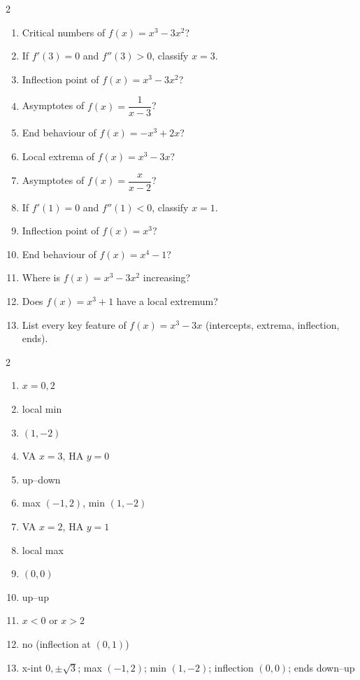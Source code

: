 \documentclass[11pt]{article}
\begin{document}
\begin{recapbox}
\begin{multicols}{2}
\small
\begin{enumerate}[leftmargin=*,itemsep=3pt]
  \item Critical numbers of $f(x)=x^3-3x^2$?
  \item If $f'(3)=0$ and $f''(3)>0$, classify $x=3$.
  \item Inflection point of $f(x)=x^3-3x^2$?
  \item Asymptotes of $f(x)=\dfrac1{x-3}$?
  \item End behaviour of $f(x)=-x^3+2x$?
  \item Local extrema of $f(x)=x^3-3x$?
  \item Asymptotes of $f(x)=\dfrac{x}{x-2}$?
  \item If $f'(1)=0$ and $f''(1)<0$, classify $x=1$.
  \item Inflection point of $f(x)=x^3$?
  \item End behaviour of $f(x)=x^4-1$?
  \item Where is $f(x)=x^3-3x^2$ increasing?
  \item Does $f(x)=x^3+1$ have a local extremum?
  \item List every key feature of $f(x)=x^3-3x$ (intercepts, extrema, inflection, ends).
\end{enumerate}
\end{multicols}
\end{recapbox}

\begin{keybox}
\begin{multicols}{2}
\small
\begin{enumerate}[leftmargin=*,itemsep=3pt]
  \item $x=0,2$
  \item local min
  \item $(1,-2)$
  \item VA $x=3$, HA $y=0$
  \item up–down
  \item max $(-1,2)$, min $(1,-2)$
  \item VA $x=2$, HA $y=1$
  \item local max
  \item $(0,0)$
  \item up–up
  \item $x<0$ or $x>2$
  \item no (inflection at $(0,1)$)
  \item x-int $0,\pm\sqrt3$; max $(-1,2)$; min $(1,-2)$; inflection $(0,0)$; ends down–up
\end{enumerate}
\end{multicols}
\end{keybox}
\end{document}
